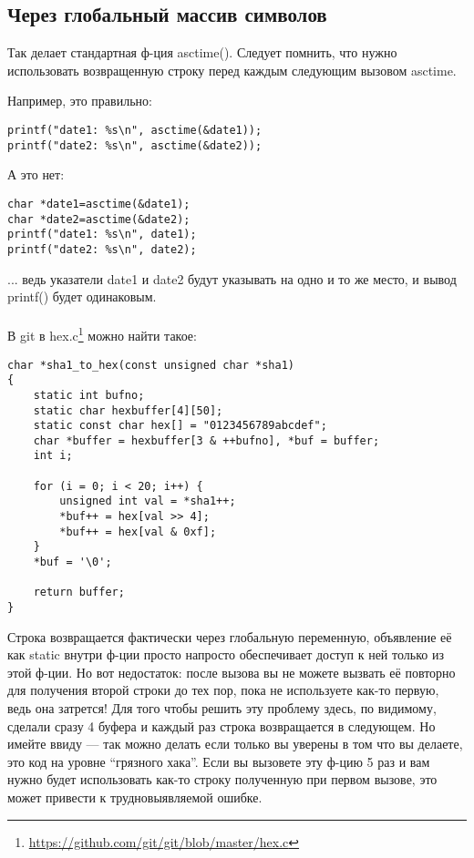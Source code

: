 \subsection{Через глобальный массив символов}

Так делает стандартная ф-ция asctime(). Следует помнить, что нужно использовать возвращенную строку
перед каждым следующим вызовом asctime. 

Например, это правильно:

\begin{lstlisting}
printf("date1: %s\n", asctime(&date1));
printf("date2: %s\n", asctime(&date2));
\end{lstlisting}

А это нет:

\begin{lstlisting}
char *date1=asctime(&date1);
char *date2=asctime(&date2);
printf("date1: %s\n", date1);
printf("date2: %s\n", date2);
\end{lstlisting}

... ведь указатели date1 и date2 будут указывать на одно и то же место, и вывод printf() будет одинаковым. \\
\\
В git в hex.c\footnote{\url{https://github.com/git/git/blob/master/hex.c}} можно найти такое:

\begin{lstlisting}
char *sha1_to_hex(const unsigned char *sha1)
{
	static int bufno;
	static char hexbuffer[4][50];
	static const char hex[] = "0123456789abcdef";
	char *buffer = hexbuffer[3 & ++bufno], *buf = buffer;
	int i;

	for (i = 0; i < 20; i++) {
		unsigned int val = *sha1++;
		*buf++ = hex[val >> 4];
		*buf++ = hex[val & 0xf];
	}
	*buf = '\0';

	return buffer;
}
\end{lstlisting}

Строка возвращается фактически через глобальную переменную, объявление её как static внутри ф-ции просто напросто
обеспечивает доступ к ней только из этой ф-ции. Но вот недостаток: после вызова  вы не можете
вызвать её повторно для получения второй строки до тех пор, пока не используете как-то первую, ведь она
затрется! Для того чтобы решить эту проблему здесь, по видимому, сделали сразу 4 буфера и каждый раз строка
возвращается в следующем. Но имейте ввиду --- так можно делать если только вы уверены в том что вы делаете,
это код на уровне ``грязного хака''.
Если вы
вызовете эту ф-цию 5 раз и вам нужно будет использовать как-то строку полученную при первом вызове, это может
привести к трудновыявляемой ошибке.

